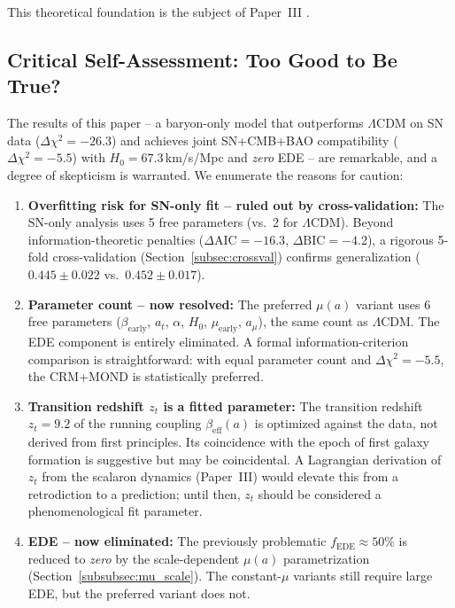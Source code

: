 \documentclass[aps,prd,twocolumn,superscriptaddress,nofootinbib,floatfix]{revtex4-2}
\begin{document}
This theoretical foundation is the subject of Paper~III \cite{Geiger2026c}.


\subsection{Critical Self-Assessment: Too Good to Be True?}

The results of this paper -- a baryon-only model that outperforms $\Lambda$CDM on SN data ($\Delta\chi^2 = -26.3$) and achieves joint SN+CMB+BAO compatibility ($\Delta\chi^2 = -5.5$) with $H_0 = 67.3$\,km/s/Mpc and \textit{zero} EDE -- are remarkable, and a degree of skepticism is warranted. We enumerate the reasons for caution:

\begin{enumerate}
\item \textbf{Overfitting risk for SN-only fit -- ruled out by cross-validation:} The SN-only analysis uses 5 free parameters (vs.\ 2 for $\Lambda$CDM). Beyond information-theoretic penalties ($\Delta\mathrm{AIC} = -16.3$, $\Delta\mathrm{BIC} = -4.2$), a rigorous 5-fold cross-validation (Section~\ref{subsec:crossval}) confirms generalization ($0.445 \pm 0.022$ vs.\ $0.452 \pm 0.017$).

\item \textbf{Parameter count -- now resolved:} The preferred $\mu(a)$ variant uses 6 free parameters ($\beta_{\mathrm{early}}$, $a_t$, $\alpha$, $H_0$, $\mu_{\mathrm{early}}$, $a_\mu$), the same count as $\Lambda$CDM. The EDE component is entirely eliminated. A formal information-criterion comparison is straightforward: with equal parameter count and $\Delta\chi^2 = -5.5$, the CRM+MOND is statistically preferred.

\item \textbf{Transition redshift $z_t$ is a fitted parameter:} The transition redshift $z_t = 9.2$ of the running coupling $\beta_{\mathrm{eff}}(a)$ is optimized against the data, not derived from first principles. Its coincidence with the epoch of first galaxy formation is suggestive but may be coincidental. A Lagrangian derivation of $z_t$ from the scalaron dynamics (Paper~III) would elevate this from a retrodiction to a prediction; until then, $z_t$ should be considered a phenomenological fit parameter.

\item \textbf{EDE -- now eliminated:} The previously problematic $f_{\mathrm{EDE}} \approx 50\%$ is reduced to \textit{zero} by the scale-dependent $\mu(a)$ parametrization (Section~\ref{subsubsec:mu_scale}). The constant-$\mu$ variants still require large EDE, but the preferred variant does not.


\end{enumerate}
\end{document}
